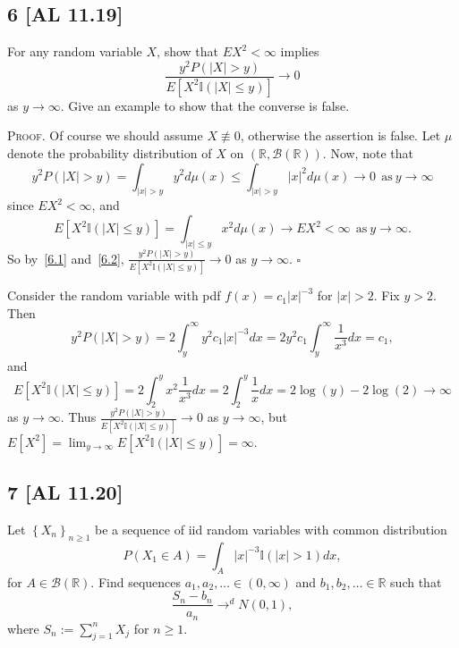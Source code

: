 \documentclass[12pt]{article}
\newcounter{ProofCounter}
\newenvironment{Proof}{\stepcounter{ProofCounter}\textsc{Proof.}}{\hfill$\square$}
\begin{document}
\newpage
\subsection*{6 [AL 11.19]}
\begin{tcolorbox}
  For any random variable $X$, show that $EX^{2} < \infty$ implies 
  \[
    \frac{y^{2}P(|X| > y)}{E[X^{2}\mathbb{I} (|X| \leq y)]} \rightarrow 0
  \]
  as $y \rightarrow\infty$. Give an example to show that the converse is false.
\end{tcolorbox}
\begin{Proof}
  Of course we should assume $X \not\equiv 0$, otherwise the assertion is false. Let $\mu$ denote the probability distribution of $X$ on
  $(\mathbb{R},\mathcal{B}(\mathbb{R}))$. Now, note that
  \begin{equation}
    y^{2}P(|X| > y) = \int_{|x| > y}y^{2}d\mu(x) \leq \int_{|x| > y}|x|^{2}d\mu(x) \rightarrow 0\ \ \text{as}\ y \rightarrow \infty
    \label{6.1}
  \end{equation}
  since $EX^{2} < \infty$, and 
  \begin{equation}
    E[X^{2}\mathbb{I} (|X| \leq y)] = \int_{|x| \leq y}x^{2}d\mu(x) \rightarrow EX^{2} < \infty \ \ \text{as} \ y \rightarrow \infty.
    \label{6.2}
  \end{equation}
  So by~\eqref{6.1} and~\eqref{6.2}, $\frac{y^{2}P(|X| > y)}{E[X^{2}\mathbb{I} (|X| \leq y)]} \rightarrow 0$ as $y \rightarrow \infty$.
\end{Proof}

\vspace{5mm}
Consider the random variable with pdf $f(x) = c_{1}|x|^{-3}$ for $|x| > 2$. Fix $y > 2$. Then
\[ y^{2}P(|X| > y) = 2\int_{y}^{\infty}y^{2}c_{1}|x|^{-3}dx = 2y^{2}c_{1}\int_{y}^{\infty}\frac{1}{x^{3}}dx = c_{1}, \]
and 
\[ E[X^{2}\mathbb{I} (|X| \leq y)] = 2\int_{2}^{y}x^{2}\frac{1}{x^{3}}dx = 2\int_{2}^{y}\frac{1}{x}dx = 2\log(y) - 2\log(2) \rightarrow \infty \]
as $y \rightarrow \infty$. Thus $\frac{y^{2}P(|X| > y)}{E[X^{2}\mathbb{I} (|X| \leq y)]} \rightarrow 0$ as $y \rightarrow \infty$, but 
$E[X^{2}] = \lim_{y\rightarrow\infty}E[X^{2}\mathbb{I} (|X| \leq y)] = \infty$.




\newpage
\subsection*{7 [AL 11.20]}
\begin{tcolorbox}
  Let $\left\{ X_n \right\}_{n\geq 1}$ be a sequence of iid random variables with common distribution
  \[
    P(X_1 \in A) = \int_{A}|x|^{-3}\mathbb{I} (|x| > 1)dx,
  \]
  for $A \in \mathcal{B}(\mathbb{R})$. Find sequences $a_1,a_2,\hdots \in (0,\infty)$ and $b_1,b_2,\hdots \in \mathbb{R}$ such that 
  \[
    \frac{S_n - b_n}{a_n} \rightarrow^{d} N(0,1),
  \]
  where $S_n := \sum_{j=1}^{n}X_j$ for $n \geq 1$.
\end{tcolorbox}
\end{document}
